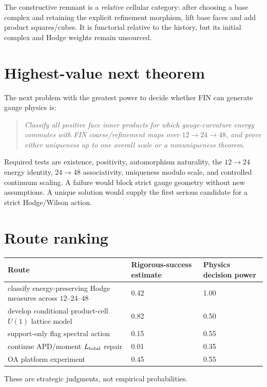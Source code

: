 \documentclass[11pt,a4paper]{article}
\begin{document}
The constructive remnant is a \emph{relative} cellular category: after choosing
a base complex and retaining the explicit refinement morphism, lift base faces
and add product squares/cubes.  It is functorial relative to the history, but
its initial complex and Hodge weights remain unsourced.

\section{Highest-value next theorem}

The next problem with the greatest power to decide whether FIN can generate
gauge physics is:
\begin{quote}
\emph{Classify all positive face inner products for which gauge-curvature
energy commutes with FIN coarse/refinement maps over $12\to24\to48$, and prove
either uniqueness up to one overall scale or a nonuniqueness theorem.}
\end{quote}

Required tests are existence, positivity, automorphism naturality, the
$12\to24$ energy identity, $24\to48$ associativity, uniqueness modulo scale,
and controlled continuum scaling.  A failure would block strict gauge geometry
without new assumptions.  A unique solution would supply the first serious
candidate for a strict Hodge/Wilson action.

\section{Route ranking}

\begin{longtable}{@{}p{}p{}p{}@{}}
\toprule
Route & Rigorous-success estimate & Physics decision power \\
\midrule\endhead
classify energy-preserving Hodge measures across $12$--$24$--$48$ & 0.42 & 1.00 \\
develop conditional product-cell $U(1)$ lattice model & 0.82 & 0.50 \\
support-only flag spectral action & 0.15 & 0.55 \\
continue APD/moment $L_{\rm total}$ repair & 0.01 & 0.35 \\
OA platform experiment & 0.45 & 0.55 \\
\bottomrule
\end{longtable}

These are strategic judgments, not empirical probabilities.
\end{document}
